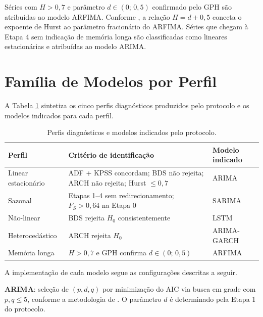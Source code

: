 \documentclass[
  12pt,
  openright,
  twoside,
  a4paper,
  english,
  brazil
]{abntex2}
\begin{document}
Séries com $H > 0{,}7$ e parâmetro $d \in (0;\, 0{,}5)$ confirmado pelo GPH são atribuídas ao modelo ARFIMA. Conforme , a relação $H = d + 0{,}5$ conecta o expoente de Hurst ao parâmetro fracionário do ARFIMA. Séries que chegam à Etapa 4 sem indicação de memória longa são classificadas como lineares estacionárias e atribuídas ao modelo ARIMA.

\section{Família de Modelos por Perfil}
\label{sec:familia-modelos}

A Tabela \ref{tab:familia-modelos} sintetiza os cinco perfis diagnósticos produzidos pelo protocolo e os modelos indicados para cada perfil.

\begin{table}[H]
  \centering
  \caption{Perfis diagnósticos e modelos indicados pelo protocolo.}
  \label{tab:familia-modelos}
  \begin{tabular}{p{3.5cm}p{6.5cm}p{3.5cm}}
    \toprule
    \textbf{Perfil} & \textbf{Critério de identificação} & \textbf{Modelo indicado} \\
    \midrule
    Linear estacionário  & ADF + KPSS concordam; BDS não rejeita; ARCH não rejeita; Hurst $\leq 0{,}7$ & ARIMA \\
    Sazonal              & Etapas 1–4 sem redirecionamento; $F_S > 0{,}64$ na Etapa 0 & SARIMA \\
    Não-linear           & BDS rejeita $H_0$ consistentemente                                          & LSTM \\
    Heterocedástico      & ARCH rejeita $H_0$                                                          & ARIMA-GARCH \\
    Memória longa        & $H > 0{,}7$ e GPH confirma $d \in (0;\, 0{,}5)$                            & ARFIMA \\
    \bottomrule
  \end{tabular}
\end{table}

A implementação de cada modelo segue as configurações descritas a seguir.

\textbf{ARIMA}: seleção de $(p, d, q)$ por minimização do AIC via busca em grade com $p, q \leq 5$, conforme a metodologia de . O parâmetro $d$ é determinado pela Etapa 1 do protocolo.
\end{document}
